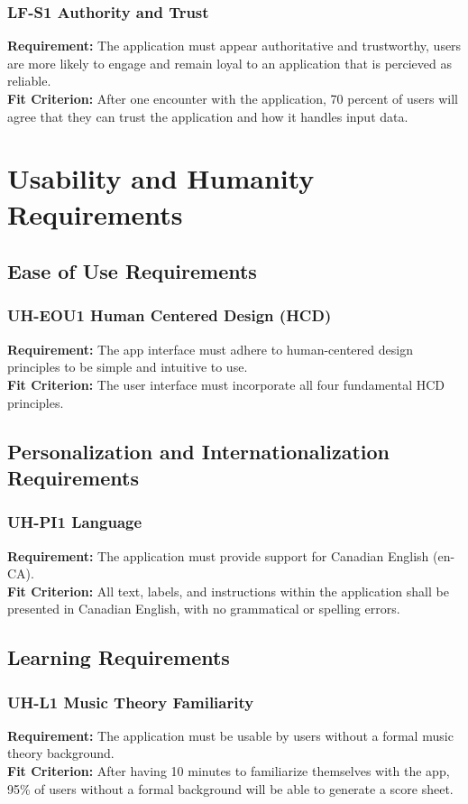 \documentclass[12pt]{article}
\begin{document}
\subsubsection*{LF-S1 Authority and Trust}
\textbf{Requirement:} The application must appear authoritative and trustworthy, users are more likely to engage
and remain loyal to an application that is percieved as reliable.\\
\textbf{Fit Criterion:} After one encounter with the application, 70 percent of users will agree 
that they can trust the application and how it handles input data.
\section{Usability and Humanity Requirements}
\subsection{Ease of Use Requirements}
\subsubsection*{UH-EOU1 Human Centered Design (HCD)}
\textbf{Requirement:} The app interface must adhere to human-centered design principles to be simple and intuitive to use.\\
\textbf{Fit Criterion:} The user interface must incorporate all four fundamental HCD principles.
\subsection{Personalization and Internationalization Requirements}
\subsubsection*{UH-PI1 Language}
\textbf{Requirement:} The application must provide support for Canadian English (en-CA).\\
\textbf{Fit Criterion:} All text, labels, and instructions within the application 
shall be presented in Canadian English, with no grammatical or spelling errors.
\subsection{Learning Requirements}
\subsubsection*{UH-L1 Music Theory Familiarity}
\textbf{Requirement:} The application must be usable by users without a formal music theory background. \\
\textbf{Fit Criterion:} After having 10 minutes to familiarize themselves with the app, 95\% of users without a 
formal background will be able to generate a score sheet.
\end{document}
